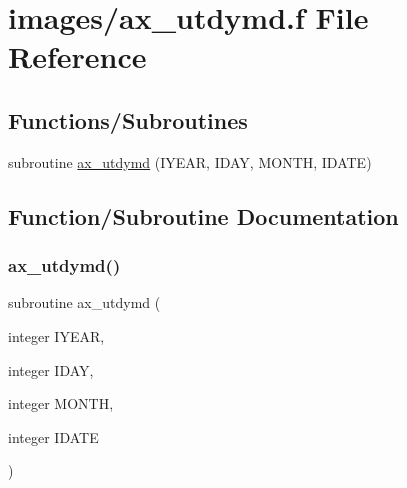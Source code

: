 \hypertarget{ax__utdymd_8f}{}\section{images/ax\+\_\+utdymd.f File Reference}
\label{ax__utdymd_8f}
\subsection*{Functions/\+Subroutines}
\begin{DoxyCompactItemize}
\item 
subroutine \hyperlink{ax__utdymd_8f_af9fc1dda9f8592e9e07084acb4ab9c42}{ax\+\_\+utdymd} (I\+Y\+E\+AR, I\+D\+AY, M\+O\+N\+TH, I\+D\+A\+TE)
\end{DoxyCompactItemize}


\subsection{Function/\+Subroutine Documentation}
\mbox{\label{ax__utdymd_8f_af9fc1dda9f8592e9e07084acb4ab9c42}} 
\subsubsection{\texorpdfstring{ax\+\_\+utdymd()}{ax\_utdymd()}}
{\footnotesize\ttfamily subroutine ax\+\_\+utdymd (\begin{DoxyParamCaption}\item[{integer}]{I\+Y\+E\+AR,  }\item[{integer}]{I\+D\+AY,  }\item[{integer}]{M\+O\+N\+TH,  }\item[{integer}]{I\+D\+A\+TE }\end{DoxyParamCaption})}

